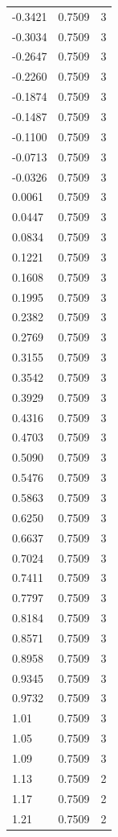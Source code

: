 \begin{longtable}{lrr}
  -0.3421 & 0.7509 & 3 \\
  -0.3034 & 0.7509 & 3 \\
  -0.2647 & 0.7509 & 3 \\
  -0.2260 & 0.7509 & 3 \\
  -0.1874 & 0.7509 & 3 \\
  -0.1487 & 0.7509 & 3 \\
  -0.1100 & 0.7509 & 3 \\
  -0.0713 & 0.7509 & 3 \\
  -0.0326 & 0.7509 & 3 \\
  0.0061 & 0.7509 & 3 \\
  0.0447 & 0.7509 & 3 \\
  0.0834 & 0.7509 & 3 \\
  0.1221 & 0.7509 & 3 \\
  0.1608 & 0.7509 & 3 \\
  0.1995 & 0.7509 & 3 \\
  0.2382 & 0.7509 & 3 \\
  0.2769 & 0.7509 & 3 \\
  0.3155 & 0.7509 & 3 \\
  0.3542 & 0.7509 & 3 \\
  0.3929 & 0.7509 & 3 \\
  0.4316 & 0.7509 & 3 \\
  0.4703 & 0.7509 & 3 \\
  0.5090 & 0.7509 & 3 \\
  0.5476 & 0.7509 & 3 \\
  0.5863 & 0.7509 & 3 \\
  0.6250 & 0.7509 & 3 \\
  0.6637 & 0.7509 & 3 \\
  0.7024 & 0.7509 & 3 \\
  0.7411 & 0.7509 & 3 \\
  0.7797 & 0.7509 & 3 \\
  0.8184 & 0.7509 & 3 \\
  0.8571 & 0.7509 & 3 \\
  0.8958 & 0.7509 & 3 \\
  0.9345 & 0.7509 & 3 \\
  0.9732 & 0.7509 & 3 \\
  1.01 & 0.7509 & 3 \\
  1.05 & 0.7509 & 3 \\
  1.09 & 0.7509 & 3 \\
  1.13 & 0.7509 & 2 \\
  1.17 & 0.7509 & 2 \\
  1.21 & 0.7509 & 2 \\

\end{longtable}
